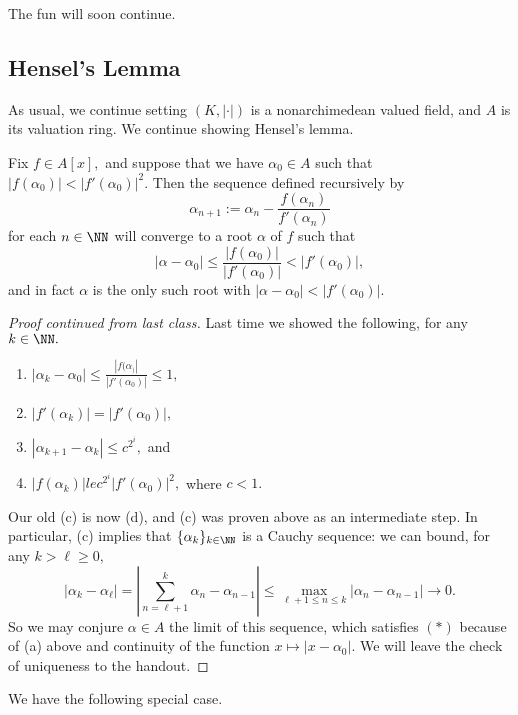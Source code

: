 














The fun will soon continue.

\subsection{Hensel's Lemma}
As usual, we continue setting $(K,|\cdot|)$ is a nonarchimedean valued field, and $A$ is its valuation ring. We continue showing Hensel's lemma.
\begin{lemma}[Hensel]
	Fix $f\in A[x],$ and suppose that we have $\alpha_0\in A$ such that $|f(\alpha_0)|<|f'(\alpha_0)|^2.$ Then the sequence defined recursively by
	\[\alpha_{n+1}:=\alpha_n-\frac{f(\alpha_n)}{f'(\alpha_n)}\]
	for each $n\in\NN$ will converge to a root $\alpha$ of $f$ such that
	\[|\alpha-\alpha_0|\le\frac{|f(\alpha_0)|}{|f'(\alpha_0)|}<|f'(\alpha_0)|,\]
	and in fact $\alpha$ is the only such root with $|\alpha-\alpha_0|<|f'(\alpha_0)|.$
\end{lemma}
\begin{proof}[Proof continued from last class]
	Last time we showed the following, for any $k\in\NN.$
	\begin{enumerate}[label=(\alph*)]
		\item $|\alpha_k-\alpha_0|\le\frac{|f(\alpha_)|}{|f'(\alpha_0)|}\le1,$
		\item $|f'(\alpha_k)|=|f'(\alpha_0)|,$
		\item $|\alpha_{k+1}-\alpha_k|\le c^{2^{i}},$ and
		\item $|f(\alpha_k)|le c^{2^i}|f'(\alpha_0)|^2,$ where $c<1.$
	\end{enumerate}
	Our old (c) is now (d), and (c) was proven above as an intermediate step. In particular, (c) implies that $\{\alpha_k\}_{k\in\NN}$ is a Cauchy sequence: we can bound, for any $k>\ell\ge0,$
	\[|\alpha_k-\alpha_\ell|=\left|\sum_{n=\ell+1}^k\alpha_n-\alpha_{n-1}\right|\le\max_{\ell+1\le n\le k}|\alpha_n-\alpha_{n-1}|\to0.\]
	So we may conjure $\alpha\in A$ the limit of this sequence, which satisfies $(*)$ because of (a) above and continuity of the function $x\mapsto|x-\alpha_0|.$ We will leave the check of uniqueness to the handout.
\end{proof}
We have the following special case.
